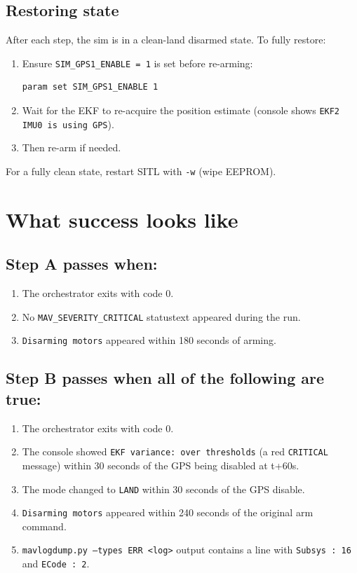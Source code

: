 \documentclass[a4paper,11pt,twoside]{article}
\begin{document}
\subsection*{Restoring state}

After each step, the sim is in a clean-land disarmed state. To fully restore:

\begin{enumerate}
  \item Ensure \texttt{SIM\_GPS1\_ENABLE = 1} is set before re-arming:
\begin{Verbatim}[frame=single,fontsize=\small]
param set SIM_GPS1_ENABLE 1
\end{Verbatim}
  \item Wait for the EKF to re-acquire the position estimate (console shows \texttt{EKF2 IMU0 is using GPS}).
  \item Then re-arm if needed.
\end{enumerate}

For a fully clean state, restart SITL with \texttt{-w} (wipe EEPROM).

\section*{What success looks like}

\subsection*{Step A passes when:}
\begin{enumerate}
  \item The orchestrator exits with code 0.
  \item No \texttt{MAV\_SEVERITY\_CRITICAL} statustext appeared during the run.
  \item \texttt{Disarming motors} appeared within 180 seconds of arming.
\end{enumerate}

\subsection*{Step B passes when all of the following are true:}
\begin{enumerate}
  \item The orchestrator exits with code 0.
  \item The console showed \texttt{EKF variance: over thresholds} (a red \texttt{CRITICAL} message) within 30 seconds of the GPS being disabled at t+60s.
  \item The mode changed to \texttt{LAND} within 30 seconds of the GPS disable.
  \item \texttt{Disarming motors} appeared within 240 seconds of the original arm command.
  \item \texttt{mavlogdump.py --types ERR <log>} output contains a line with \texttt{Subsys : 16} and \texttt{ECode : 2}.
\end{enumerate}
\end{document}

